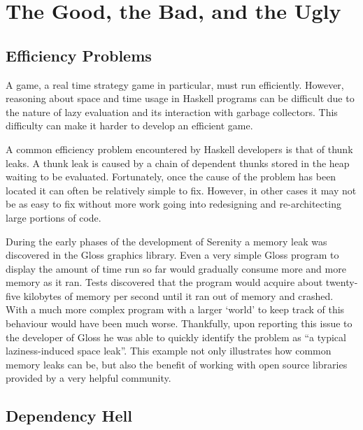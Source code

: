 \section{The Good, the Bad, and the Ugly}


\subsection{Efficiency Problems}

A game, a real time strategy game in particular, must run efficiently.
However, reasoning about space and time usage in Haskell programs can be difficult due to the nature
of lazy evaluation and its interaction with garbage collectors.\cite{cheplyaka2012} This difficulty
can make it harder to develop an efficient game.

A common efficiency problem encountered by Haskell developers is that of thunk leaks.
A thunk leak is caused by a chain of dependent thunks stored in the heap waiting to
be evaluated. Fortunately, once the cause of the problem has been located it can often
be relatively simple to fix.\cite{ezyang2011} However, in other cases it may not be
as easy to fix without more work going into redesigning and re-architecting large
portions of code.

During the early phases of the development of Serenity a memory leak was discovered in
the Gloss graphics library. Even a very simple Gloss program to display the amount of time
run so far would gradually consume more and more memory as it ran. Tests discovered that
the program would acquire about twenty-five kilobytes of memory per second until it ran
out of memory and crashed. With a much more complex program with a larger `world' to keep
track of this behaviour would have been much worse. Thankfully, upon reporting this issue
to the developer of Gloss he was able to quickly identify the problem as ``a typical
laziness-induced space leak''. This example not only illustrates how
common memory leaks can be, but also the benefit of working with open source libraries
provided by a very helpful community.

\subsection{Dependency Hell}

